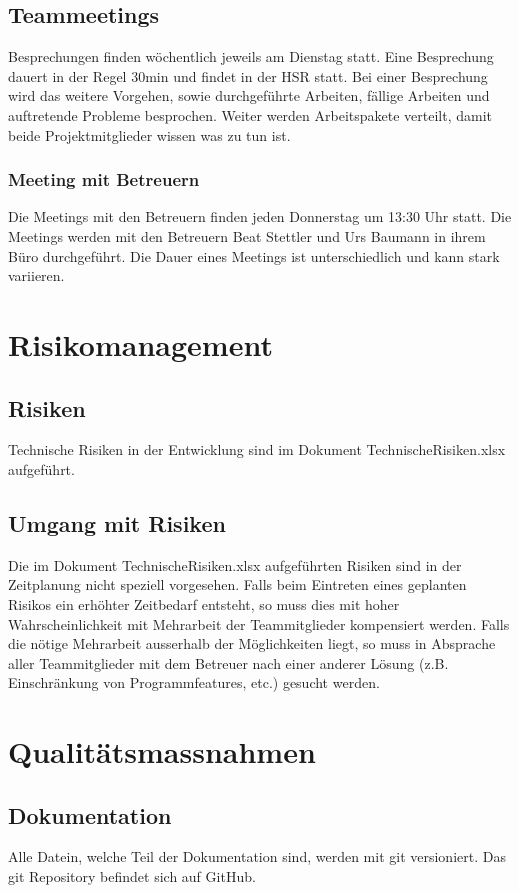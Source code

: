 \documentclass[a4,12pt]{scrartcl}
\begin{document}
\subsection{Teammeetings}
Besprechungen finden wöchentlich jeweils am Dienstag statt. 
Eine Besprechung dauert in der Regel 30min und findet in der HSR statt. Bei einer Besprechung wird das weitere Vorgehen, sowie durchgeführte Arbeiten, fällige Arbeiten und auftretende Probleme besprochen. Weiter werden Arbeitspakete verteilt, damit beide Projektmitglieder wissen was zu tun ist. 

\subsubsection{Meeting mit Betreuern}
Die Meetings mit den Betreuern finden jeden Donnerstag um 13:30 Uhr statt. 
Die Meetings werden mit den Betreuern Beat Stettler und Urs Baumann in ihrem Büro durchgeführt. Die Dauer eines Meetings ist unterschiedlich und kann stark variieren. 

\section{Risikomanagement}
\subsection{Risiken}
Technische Risiken in der Entwicklung sind im Dokument TechnischeRisiken.xlsx aufgeführt.
\subsection{Umgang mit Risiken}
Die im Dokument TechnischeRisiken.xlsx aufgeführten Risiken sind in der Zeitplanung nicht speziell vorgesehen. Falls beim Eintreten eines geplanten Risikos ein erhöhter Zeitbedarf entsteht, so muss dies mit hoher Wahrscheinlichkeit mit Mehrarbeit der Teammitglieder kompensiert werden. Falls die nötige Mehrarbeit ausserhalb der Möglichkeiten liegt, so muss in Absprache aller Teammitglieder mit dem Betreuer nach einer anderer Lösung (z.B. Einschränkung von Programmfeatures, etc.) gesucht werden.


\section{Qualitätsmassnahmen}

\subsection{Dokumentation}
Alle Datein, welche Teil der Dokumentation sind, werden mit git versioniert. Das git Repository befindet sich auf GitHub.
\end{document}
